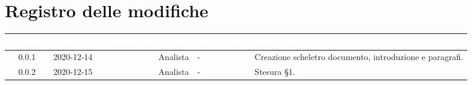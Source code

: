 \section*{Registro delle modifiche}
{
\renewcommand{\arraystretch}{1.5}
\centering
\begin{longtable}{c C{2.6cm} C{2.6cm} C{2.6cm} C{2.6cm} C{3.5cm}}
\textcolor{white}{\textbf{Versione}}&
\textcolor{white}{\textbf{Data}}&
\textcolor{white}{\textbf{Nominativo}}&
\textcolor{white}{\textbf{Ruolo}}&
\textcolor{white}{\textbf{Verificatore}}&
\textcolor{white}{\textbf{Descrizione}}\\	
\endhead
		
0.0.1 & 2020-12-14 & \ZM{} & Analista & - & Creazione scheletro documento, introduzione e paragrafi. \\
0.0.2 & 2020-12-15 & \PA{} & Analista & - & Stesura \S 1. \\
		
\end{longtable}
}
